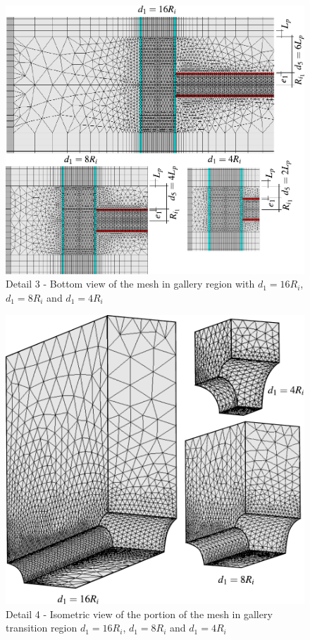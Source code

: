 \documentclass[a4paper,fleqn]{cas-sc}
\begin{document}
\begin{figure}[h!]
	\centering
	\includegraphics[scale=0.6]{Mesh4.pdf}
	\caption{Detail 3 - Bottom view  of the mesh in gallery region with $d_1=16R_i$, $d_1=8R_i$ and $d_1=4R_i$}
	\label{Mesh4}
\end{figure}
\begin{figure}[h!]
	\centering
	\includegraphics[scale=0.6]{Mesh5.pdf}
	\caption{Detail 4 - Isometric view of the portion of the mesh in gallery transition region $d_1=16R_i$, $d_1=8R_i$ and $d_1=4R_i$}
	\label{Mesh5}
\end{figure}
\end{document}
